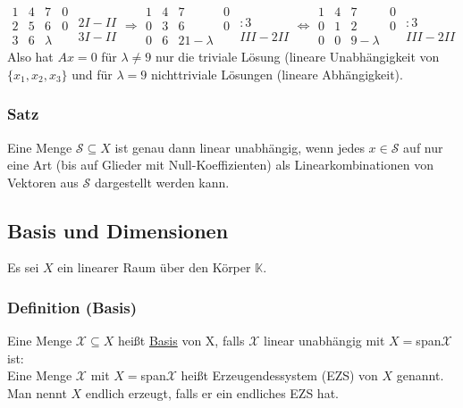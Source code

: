 \begin{enumerate}
\[\begin{array}{ccc|c}1 & 4 & 7 & 0\\ 2 & 5 & 6 & 0\\ 3 & 6 & \lambda \end{array}\begin{matrix}\\ 2I-II\\ 3I-II\end{matrix} \Rightarrow \begin{array}{ccc|c}1 & 4 & 7 & 0\\ 0 & 3 & 6 & 0\\ 0 & 6 & 21 - \lambda \end{array}\begin{matrix}\\ :3\\ III-2II\end{matrix} \Leftrightarrow \begin{array}{ccc|c}1 & 4 & 7 & 0\\ 0 & 1 & 2 & 0\\ 0 & 0 & 9 - \lambda \end{array}\begin{matrix}\\ :3\\ III-2II\end{matrix}\]
Also hat $Ax=0$ für $\lambda \not= 9$ nur die triviale Lösung (lineare Unabhängigkeit von $\{x_1,x_2,x_3\}$ und für $\lambda = 9$ nichttriviale Lösungen (lineare Abhängigkeit).
\end{enumerate}
\subsubsection{Satz}
Eine Menge $\mathcal{S}\subseteq X$ ist genau dann linear unabhängig, wenn jedes $x\in\mathcal{S}$ auf nur eine Art (bis auf Glieder mit Null-Koeffizienten) als Linearkombinationen von Vektoren aus $\mathcal{S}$ dargestellt werden kann.
\subsection{Basis und Dimensionen}
Es sei $X$ ein linearer Raum über den Körper $\mathbb{K}$.
\subsubsection{Definition (Basis)}
Eine Menge $\mathcal{X}\subseteq X$ heißt \underline{Basis} von X, falls $\mathcal{X}$ linear unabhängig mit $X=$span$\mathcal{X}$ ist:\\
Eine Menge $\mathcal{X}$ mit $X=$span$\mathcal{X}$ heißt Erzeugendessystem (EZS) von $X$ genannt.  Man nennt $X$ endlich erzeugt, falls er ein endliches EZS hat.
